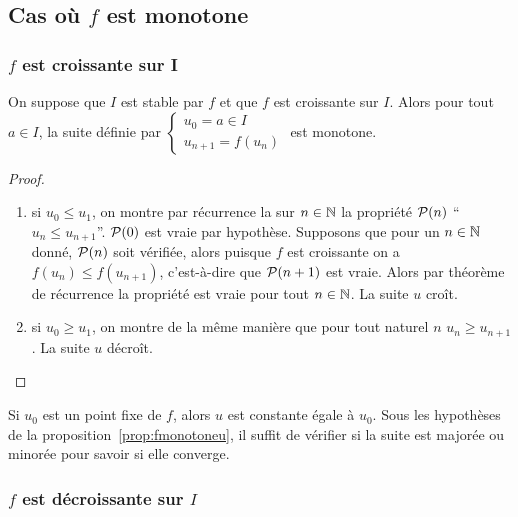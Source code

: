 \subsection{Cas où \(f\) est monotone}

\subsubsection{\(f\) est croissante sur I}

\begin{prop}\label{prop:fmonotoneu}
  On suppose que \(I\) est stable par \(f\) et que \(f\) est croissante sur
  \(I\). Alors pour tout \(a \in I\), la suite définie par \(\begin{cases} u_0=a
  \in I \\ u_{n+1}=f(u_n) \end{cases}\) est monotone.
\end{prop}
\begin{proof}
  \begin{enumerate}
    \item si \(u_0 \leqslant u_1\), on montre par récurrence la sur \(n \in \N\)
      la propriété \(\P(n)\) ``\(u_n \leqslant u_{n+1}\)''. \(\P(0)\) est vraie
      par hypothèse. Supposons que pour un \(n \in \N\) donné, \(\P(n)\) soit
      vérifiée, alors puisque \(f\) est croissante on a \(f(u_n) \leqslant
      f(u_{n+1})\), c'est-à-dire que \(\P(n+1)\) est vraie. Alors par théorème
      de récurrence la propriété est vraie pour tout \(n \in \N\). La suite
      \(u\) croît.
    \item si \(u_0 \geqslant u_1\), on montre de la même manière que pour tout
      naturel \(n\) \(u_n \geqslant u_{n+1}\). La suite \(u\) décroît.
  \end{enumerate}
\end{proof}

Si \(u_0\) est un point fixe de \(f\), alors \(u\) est constante égale à
\(u_0\). Sous les hypothèses de la proposition~\ref{prop:fmonotoneu},
il suffit de vérifier si la suite est majorée ou minorée pour savoir si elle
converge.

\subsubsection{\(f\) est décroissante sur \(I\)}

